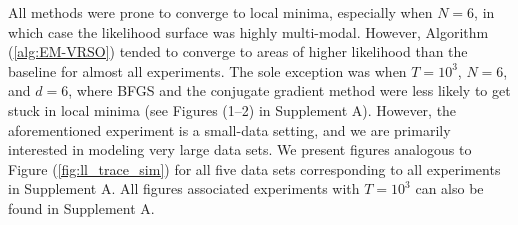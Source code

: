 %
All methods were prone to converge to local minima, especially when $N=6$, in which case the likelihood surface was highly multi-modal. However, Algorithm (\ref{alg:EM-VRSO}) tended to converge to areas of higher likelihood than the baseline for almost all experiments. The sole exception was when $T=10^3$, $N=6$, and $d=6$, where BFGS and the conjugate gradient method were less likely to get stuck in local minima (see Figures (1--2) in Supplement A). However, the aforementioned experiment is a small-data setting, and we are primarily interested in modeling very large data sets. %
%
%
We present figures analogous to Figure (\ref{fig:ll_trace_sim}) for all five data sets corresponding to all experiments in Supplement A. All figures associated experiments with $T=10^3$ can also be found in Supplement A. 

%




